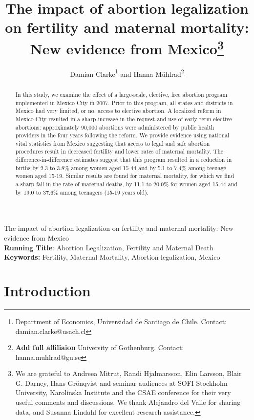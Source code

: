 \documentclass[a4paper, 11pt]{article}
\title{The impact of abortion legalization on fertility and maternal mortality: New evidence from Mexico\thanks{We are grateful to Andreea Mitrut, Randi Hjalmarsson, Elin Larsson, Blair G. Darney, Hans Gr\"onqvist and seminar audiences at SOFI Stockholm University, Karolinska Institute and the CSAE conference for their very useful comments and discussions.  We thank Alejandro del Valle for sharing data, and Susanna Lindahl for excellent research assistance.}}
\author{Damian Clarke\thanks{Department of Economics, Universidad de Santiago de Chile.  Contact: damian.clarke@usach.cl} and Hanna Mühlrad\thanks{\textbf{Add full affiliaion} University of Gothenburg. Contact: hanna.muhlrad@gu.se}}
\begin{document}
\maketitle
\newpage
{}

\begin{spacing}{2}
\begin{center}
  {\Large The impact of abortion legalization on fertility and maternal mortality: New evidence from Mexico}
  \\
\vspace{5mm}
  \textbf{Running Title}: Abortion Legalization, Fertility and Maternal Death \\
\textbf{Keywords:} Fertility, Maternal Mortality, Abortion legalization, Mexico

\end{center}

\newpage

\begin{abstract}
\noindent In this study, we examine the effect of a large-scale, elective, free abortion program implemented in Mexico City in 2007. Prior to this program, all states and districts in Mexico had very limited, or no, access to elective abortion. A localized reform in Mexico City resulted in a sharp increase in the request and use of early term elective abortions: approximately 90,000 abortions were administered by public health providers in the four years following the reform. We provide evidence using national vital statistics from Mexico suggesting that access to legal and safe abortion procedures result in decreased fertility and lower rates of maternal mortality. The difference-in-difference estimates suggest that this program resulted in a reduction in births by 2.3 to 3.8\% among women aged 15-44 and by 5.1 to 7.4\% among teenage women aged 15-19. Similar results are found for maternal mortality, for which we find a sharp fall in the rate of maternal deaths, by 11.1 to 20.0\% for women aged 15-44 and by 19.0 to 37.6\% among teenagers (15-19 years old).  
\end{abstract}



\newpage 
\section{Introduction}



\end{spacing}
\end{document}
